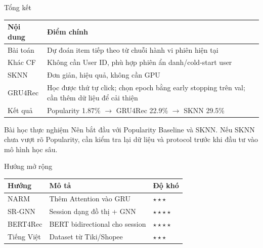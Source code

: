 \documentclass[aspectratio=169, 11pt]{beamer}
\begin{document}
\begin{frame}{Tổng kết}
\small
\begin{table}
\centering
\begin{tabular}{lp{8cm}}
\toprule
\textbf{Nội dung} & \textbf{Điểm chính} \\
\midrule
Bài toán & Dự đoán item tiếp theo từ chuỗi hành vi phiên hiện tại \\
Khác CF & Không cần User ID, phù hợp phiên ẩn danh/cold-start user \\
SKNN & Đơn giản, hiệu quả, không cần GPU \\
GRU4Rec & Học được thứ tự click; chọn epoch bằng early stopping trên val; cần thêm dữ liệu để cải thiện \\
Kết quả & Popularity 1.87\% $\rightarrow$ GRU4Rec 22.9\% $\rightarrow$ SKNN 29.5\% \\
\bottomrule
\end{tabular}
\end{table}

\vspace{0.15cm}
\small
\begin{block}{Bài học thực nghiệm}
Nên bắt đầu với Popularity Baseline và SKNN. Nếu SKNN chưa vượt rõ Popularity, cần kiểm tra lại dữ liệu và protocol trước khi đầu tư vào mô hình học sâu.
\end{block}
\end{frame}

\begin{frame}{Hướng mở rộng}
\begin{table}
\centering
\begin{tabular}{lll}
\toprule
\textbf{Hướng} & \textbf{Mô tả} & \textbf{Độ khó} \\
\midrule
NARM & Thêm Attention vào GRU & $\star\star\star$ \\
SR-GNN & Session dạng đồ thị + GNN & $\star\star\star\star$ \\
BERT4Rec & BERT bidirectional cho session & $\star\star\star\star$ \\
Tiếng Việt & Dataset từ Tiki/Shopee & $\star\star\star$ \\
\bottomrule
\end{tabular}
\end{table}
\end{frame}
\end{document}
